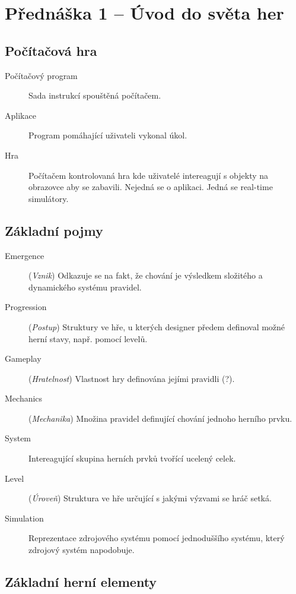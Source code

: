 \section{Přednáška 1 -- Úvod do světa her}

\subsection*{Počítačová hra}

\medskip

\begin{description}
    \item[Počítačový program] Sada instrukcí spouštěná počítačem.
    \item[Aplikace] Program pomáhající uživateli vykonal úkol.
    \item[Hra] Počítačem kontrolovaná hra kde uživatelé intereagují s objekty na obrazovce aby se zabavili. Nejedná se o aplikaci. Jedná se real-time simulátory.
\end{description}

\subsection*{Základní pojmy}

\medskip

\begin{description}
    \item[Emergence] (\textit{Vznik}) Odkazuje se na fakt, že chování je výsledkem složitého a dynamického systému pravidel.
    \item[Progression] (\textit{Postup}) Struktury ve hře, u kterých designer předem definoval možné herní stavy, např. pomocí levelů.
    \item[Gameplay] (\textit{Hratelnost}) Vlastnost hry definována jejími pravidli (?).
    \item[Mechanics] (\textit{Mechanika}) Množina pravidel definující chování jednoho herního prvku.
    \item[System] Intereagující skupina herních prvků tvořící ucelený celek.
    \item[Level] (\textit{Úroveň}) Struktura ve hře určující s jakými výzvami se hráč setká.
    \item[Simulation] Reprezentace zdrojového systému pomocí jednoduššího systému, který zdrojový systém napodobuje.
\end{description}

\subsection*{Základní herní elementy}

